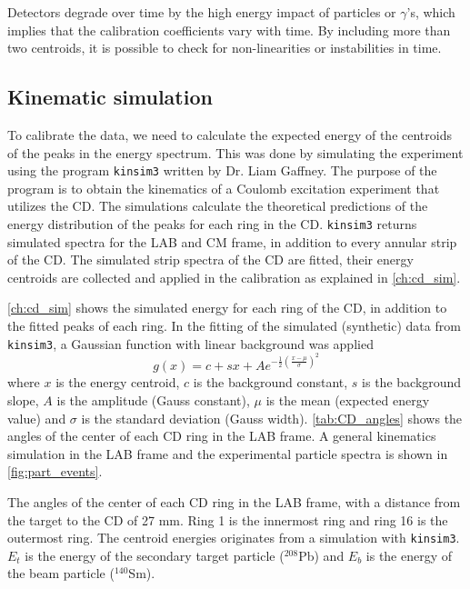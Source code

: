 \documentclass[twoside,english]{uiofysmaster/uiofysmaster}
\newcommand{\Sm}{$^{140}$Sm} %
\newcommand{\Pb}{$^{208}$Pb}
\newcommand{\ga}{$\gamma$}
\let\orgautoref\autoref
\renewcommand{\autoref}
        {%
		 \def\sectionautorefname{Section}%
		 \def\subsectionautorefname{Section}%
		 \def\subsubsectionautorefname{Section}%
		 \def\chapterautorefname{Chapter}%
          \orgautoref}
\begin{document}
Detectors degrade over time by the high energy impact of particles or \ga's, which implies that the calibration coefficients vary with time.
By including more than two centroids, it is possible to check for non-linearities or instabilities in time.



\subsection{Kinematic simulation}\label{ssec:kinsim}
To calibrate the data, we need to calculate the expected energy of the centroids of the peaks in the energy spectrum. 
This was done by simulating the experiment using the program \texttt{kinsim3} \cite{kinsim} written by Dr. Liam Gaffney. 
The purpose of the program is to obtain the kinematics of a Coulomb excitation experiment that utilizes the CD. 
The simulations calculate the theoretical predictions of the energy distribution of the peaks for each ring in the CD. 
\texttt{kinsim3} returns simulated spectra for the LAB and CM frame, in addition to every annular strip of the CD.
The simulated strip spectra of the CD are fitted, their energy centroids are collected and applied in the calibration as explained in \autoref{ch:cd_sim}.

\autoref{ch:cd_sim} shows the simulated energy for each ring of the CD, in addition to the fitted peaks of each ring.
In the fitting of the simulated (synthetic) data from \texttt{kinsim3}, a Gaussian function with linear background was applied
\begin{equation}
	g(x) = c + sx + A e^{-\frac{1}{2}\left(\frac{x - \mu}{\sigma}\right)^2}
\end{equation}
where $x$ is the energy centroid, $c$ is the background constant, $s$ is the background slope, $A$ is the amplitude (Gauss constant), $\mu$ is the mean (expected energy value) and $\sigma$ is the standard deviation (Gauss width). 
\autoref{tab:CD_angles} shows the angles of the center of each CD ring in the LAB frame.
A general kinematics simulation in the LAB frame and the experimental particle spectra is shown in \autoref{fig:part_events}. 

\begin{table}[htb] 
    \centering 
    \caption{The angles of the center of each CD ring in the LAB frame, with a distance from the target to the CD of 27 mm. 
    Ring 1 is the innermost ring and ring 16 is the outermost ring. 
    The centroid energies originates from a simulation with \texttt{kinsim3}. 
    $E_t$ is the energy of the secondary target particle (\Pb) and $E_b$ is the energy of the beam particle (\Sm).}
	
	\label{tab:CD_angles}
\end{table}
\end{document}
